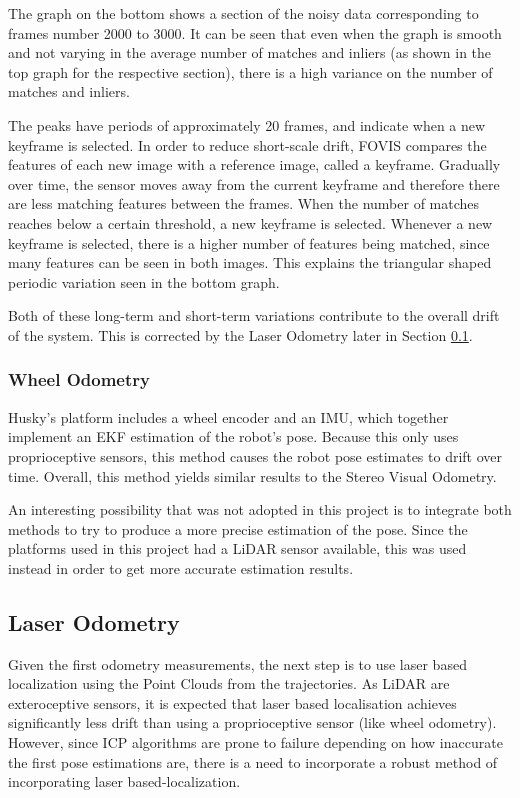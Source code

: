 \documentclass[11pt]{article}
\begin{document}
The graph on the bottom shows a section of the noisy data corresponding to frames number 2000 to 3000. It can be seen that even when the graph is smooth and not varying in the average number of matches and inliers (as shown in the top graph for the respective section), there is a high variance on the number of matches and inliers. 

The peaks have periods of approximately 20 frames, and indicate when a new keyframe is selected. In order to reduce short-scale drift, FOVIS compares the features of each new image with a reference image, called a keyframe. Gradually over time, the sensor moves away from the current keyframe and therefore there are less matching features between the frames. When the number of matches reaches below a certain threshold, a new keyframe is selected. Whenever a new keyframe is selected, there is a higher number of features being matched, since many features can be seen in both images. This explains the triangular shaped periodic variation seen in the bottom graph.

Both of these long-term and short-term variations contribute to the overall drift of the system. This is corrected by the Laser Odometry later in Section \ref{subs:LaserOd}.	
	
	\subsubsection*{Wheel Odometry}

Husky's platform includes a wheel encoder and an IMU, which together implement an EKF estimation of the robot's pose. Because this only uses proprioceptive sensors, this method causes the robot pose estimates to drift over time. Overall, this method yields similar results to the Stereo Visual Odometry.

An interesting possibility that was not adopted in this project is to integrate both methods to try to produce a more precise estimation of the pose. Since the platforms used in this project had a LiDAR sensor available, this was used instead in order to get more accurate estimation results.

	\subsection{Laser Odometry}
	\label{subs:LaserOd}
Given the first odometry measurements, the next step is to use laser based localization using the Point Clouds from the trajectories. As LiDAR are exteroceptive sensors, it is expected that laser based localisation achieves significantly less drift than using a proprioceptive sensor (like wheel odometry). However, since ICP algorithms are prone to failure depending on how inaccurate the first pose estimations are, there is a need to incorporate a robust method of incorporating laser based-localization.
	
\end{document}
